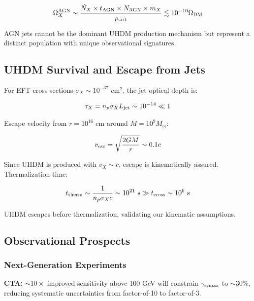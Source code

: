 \documentclass[twocolumn,superscriptaddress,prd,nofootinbib]{revtex4-2}
\begin{document}
\begin{equation}
\Omega_X^{\rm AGN} \sim \frac{\dot{N}_X \times t_{\rm AGN} \times N_{\rm AGN} \times m_X}{\rho_{\rm crit}} \lesssim 10^{-10} \Omega_{\rm DM}
\label{eq:Omega_AGN}
\end{equation}

AGN jets cannot be the dominant UHDM production mechanism but represent a distinct population with unique observational signatures.

\subsection{UHDM Survival and Escape from Jets}

For EFT cross sections $\sigma_X \sim 10^{-37}$ cm$^2$, the jet optical depth is:

\begin{equation}
\tau_X = n_p \sigma_X L_{\rm jet} \sim 10^{-14} \ll 1
\label{eq:tau_X}
\end{equation}

Escape velocity from $r = 10^{16}$ cm around $M = 10^9 M_\odot$:

\begin{equation}
v_{\rm esc} = \sqrt{\frac{2GM}{r}} \sim 0.1c
\label{eq:v_esc}
\end{equation}

Since UHDM is produced with $v_X \sim c$, escape is kinematically assured. Thermalization time:

\begin{equation}
t_{\rm therm} \sim \frac{1}{n_p \sigma_X c} \sim 10^{21} \text{ s} \gg t_{\rm cross} \sim 10^6 \text{ s}
\label{eq:t_therm}
\end{equation}

UHDM escapes before thermalization, validating our kinematic assumptions.

\subsection{Observational Prospects}

\subsubsection{Next-Generation Experiments}

\textbf{CTA:} $\sim 10\times$ improved sensitivity above 100 GeV will constrain $\gamma_{e,\rm max}$ to $\sim 30\%$, reducing systematic uncertainties from factor-of-10 to factor-of-3.
\end{document}
